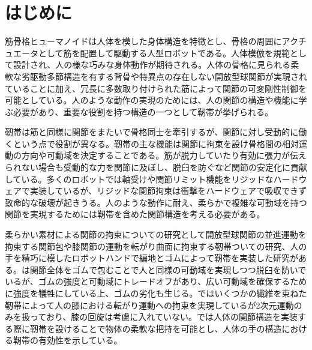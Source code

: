 \documentclass{jarticle}
\begin{document}
\date{} %

\maketitle
\thispagestyle{empty}
\pagestyle{empty}

\small
\section{はじめに}
筋骨格ヒューマノイド\cite{SR2017:asano:design}は人体を模した身体構造を特徴とし、骨格の周囲にアクチュエータとして筋を配置して駆動する人型ロボットである。人体模倣を規範として設計され、人の様な巧みな身体動作が期待される。人体の骨格に見られる柔軟な劣駆動多節構造を有する背骨や特異点の存在しない開放型球関節が実現されていることに加え、冗長に多数取り付けられた筋によって関節の可変剛性制御を可能としている。人のような動作の実現のためには、人の関節の構造や機能に学ぶ必要があり、重要な役割を持つ構造の一つとして靭帯が挙げられる。

靭帯は筋と同様に関節をまたいで骨格同士を牽引するが、関節に対し受動的に働くという点で役割が異なる。靭帯の主な機能は関節に拘束を設け骨格間の相対運動の方向や可動域を決定することである。筋が脱力していたり有効に張力が伝えられない場合も受動的な力を関節に及ぼし、脱臼を防ぐなど関節の安定化に貢献している。多くのロボットでは軸受けや関節リミット機能をリジッドなハードウェアで実装しているが、リジッドな関節拘束は衝撃をハードウェアで吸収できず致命的な破壊が起きうる。人のような動作に耐え、柔らかで複雑な可動域を持つ関節を実現するためには靭帯を含めた関節構造を考える必要がある。

柔らかい素材による関節の拘束についての研究として開放型球関節の並進運動を拘束する関節包\cite{Biorob2018:fujii:capsule}や膝関節の運動を転がり曲面に拘束する靭帯ついての研究\cite{RoboSym:sonoda:ligaments}、人の手を精巧に模したロボットハンドで編地とゴムによって靭帯を実装した研究\cite{ICRA2016:xu:hand}がある。\cite{Biorob2018:fujii:capsule}は関節全体をゴムで包むことで人と同様の可動域を実現しつつ脱臼を防いでいるが、ゴムの強度と可動域にトレードオフがあり、広い可動域を確保するために強度を犠牲にしている上、ゴムの劣化も生じる。\cite{RoboSym:sonoda:ligaments}ではいくつかの繊維を束ねた靭帯によって人の膝における転がり運動への拘束を実現しているが2次元運動のみを扱っており、膝の回旋は考慮に入れていない。\cite{ICRA2016:xu:hand}では人体の関節構造を実装する際に靭帯を設けることで物体の柔軟な把持を可能とし、人体の手の構造における靭帯の有効性を示している。
\end{document}
